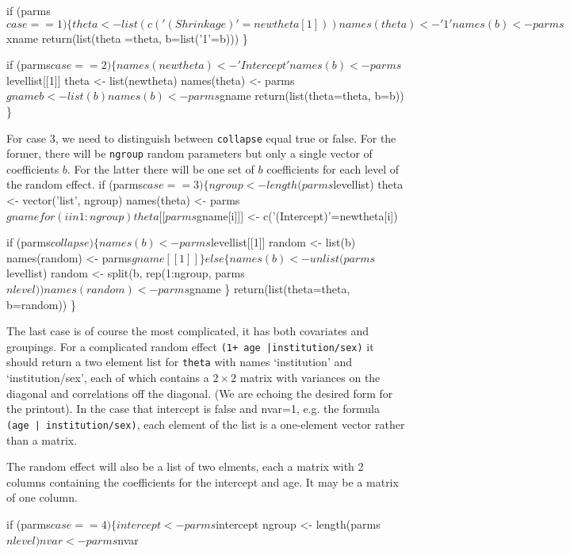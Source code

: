 \documentclass{article}
\begin{document}
    if (parms$case==1) \{
        theta <- list(c('(Shrinkage)' = newtheta[1]))
        names(theta) <- '1'
        names(b) <- parms$xname
        return(list(theta =theta, b=list('1'=b)))
        \}

    if (parms$case==2) \{
        names(newtheta) <- 'Intercept'
        names(b) <- parms$levellist[[1]]
        theta <- list(newtheta)
        names(theta) <- parms$gname
        b <- list(b)
        names(b) <- parms$gname
        return(list(theta=theta, b=b))
        \}
\nwendcode{}\nwdocspar

For case 3, we need to distinguish between {\tt{}collapse} equal true or
false.  For the former, there will be {\tt{}ngroup} random parameters but
only a single vector of coefficients $b$.
For the latter there will be one set of $b$ coefficients for each
level of the random effect.
\nwenddocs{}\plusendmoddef
    if (parms$case==3) \{
        ngroup <- length(parms$levellist)
        theta <- vector('list', ngroup)
        names(theta) <- parms$gname
        for (i in 1:ngroup) 
            theta[[parms$gname[i]]] <- c('(Intercept)'=newtheta[i])

        if (parms$collapse) \{
            names(b) <- parms$levellist[[1]]
            random <- list(b)
            names(random) <- parms$gname[[1]]
            \}
        else \{
            names(b) <- unlist(parms$levellist)
            random <- split(b, rep(1:ngroup, parms$nlevel))
            names(random) <- parms$gname
            \}
        return(list(theta=theta, b=random))
        \}
\nwendcode{}\nwdocspar

The last case is of course the most complicated, it has both covariates
and groupings.
For a complicated random effect {\tt{}(1+\ age\ |institution/sex)} it should return
a two element list for {\tt{}theta} with names `institution' and
`institution/sex', each of which contains a $2 \times 2$ 
matrix with variances on
the diagonal and correlations off the diagonal.
(We are echoing the desired form for the printout).
In the case that intercept is false and nvar=1, e.g. the formula
{\tt{}(age\ |\ institution/sex)}, each element of the list is a one-element
vector rather than a matrix.

The random effect will also be a list of two elments, each a matrix
with 2 columns containing the coefficients for the intercept and age.
It may be a matrix of one column.

\nwenddocs{}\plusendmoddef
    if (parms$case==4) \{
        intercept <- parms$intercept
        ngroup <- length(parms$nlevel)
        nvar <- parms$nvar
\end{document}
